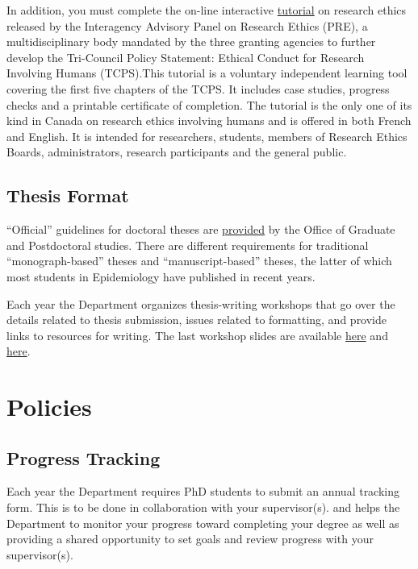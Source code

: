 \documentclass[
  openany]{book}
\begin{document}
In addition, you must complete the on-line interactive \href{http://www.pre.ethics.gc.ca/eng/education/tutorial-didacticiel/}{tutorial} on research ethics released by the Interagency Advisory Panel on Research Ethics (PRE), a multidisciplinary body mandated by the three granting agencies to further develop the Tri-Council Policy Statement: Ethical Conduct for Research Involving Humans (TCPS).This tutorial is a voluntary independent learning tool covering the first five chapters of the TCPS. It includes case studies, progress checks and a printable certificate of completion. The tutorial is the only one of its kind in Canada on research ethics involving humans and is offered in both French and English. It is intended for researchers, students, members of Research Ethics Boards, administrators, research participants and the general public.

\hypertarget{thesis-format}{%
\section{Thesis Format}\label{thesis-format}}

``Official'' guidelines for doctoral theses are \href{https://www.mcgill.ca/gps/thesis/thesis-guidelines/preparation}{provided} by the Office of Graduate and Postdoctoral studies. There are different requirements for traditional ``monograph-based'' theses and ``manuscript-based'' theses, the latter of which most students in Epidemiology have published in recent years.

Each year the Department organizes thesis-writing workshops that go over the details related to thesis submission, issues related to formatting, and provide links to resources for writing. The last workshop slides are available \href{docs/PhD_Epi_Thesis_Writing_Workshop_5Feb2021_KHayden.pptx}{here} and \href{docs/thesis-workshop-PhD-2021-02-05.pdf}{here}.

\hypertarget{policies}{%
\chapter{Policies}\label{policies}}

\hypertarget{progress-tracking}{%
\section{Progress Tracking}\label{progress-tracking}}

Each year the Department requires PhD students to submit an annual tracking form. This is to be done in collaboration with your supervisor(s). and helps the Department to monitor your progress toward completing your degree as well as providing a shared opportunity to set goals and review progress with your supervisor(s).
\end{document}
